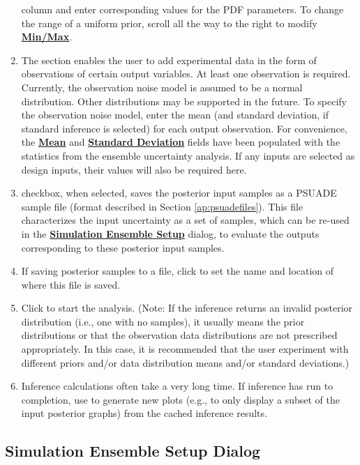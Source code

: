 \begin{enumerate}
	column and enter corresponding values for the PDF parameters. 
   To change the range of a uniform prior, scroll all the way to the right
	to modify \textbf{\underline{Min/Max}}. 
\item
	The  section enables the user to add experimental data
   in the form of observations of certain output variables.
   At least one observation is required.
   Currently, the	observation noise model is assumed to be a normal
	distribution. Other distributions may be supported in the future. To
	specify the observation noise model, enter the mean (and standard
	deviation, if standard inference is selected) for each output observation. For
	convenience, the \textbf{\underline{Mean}} and \textbf{\underline{Standard Deviation}} fields have been populated
	with the statistics from the ensemble uncertainty analysis. If any inputs
   are selected as design inputs, their values will also be required here.
\item
	 checkbox, when selected, saves the
	posterior input samples as a PSUADE sample file	(format described in
	Section \ref{ap:psuadefiles}). This file characterizes the input
	uncertainty as a set of samples, which can be re-used in the \textbf{\underline{Simulation Ensemble
	Setup}} dialog, to evaluate the outputs corresponding to these posterior
	input samples.
\item
	If saving posterior samples to a file, click  to set the
	name and location of where this file is saved.
\item
	Click  to start the analysis. (Note: If the inference returns
	an invalid posterior distribution (i.e., one with no samples), it
	usually means the prior distributions or that the observation data
	distributions are not prescribed appropriately. In this case, it is
	recommended that the user experiment with different priors and/or data
	distribution means and/or standard deviations.)
\item{Inference calculations often take a very long time. If inference has
	run to completion, use  to generate new plots (e.g., to only
	display a subset of the input posterior graphs) from the cached
	inference results.}
\end{enumerate}

\subsection{Simulation Ensemble Setup Dialog}
\label{subsec:uq_simsetup}

